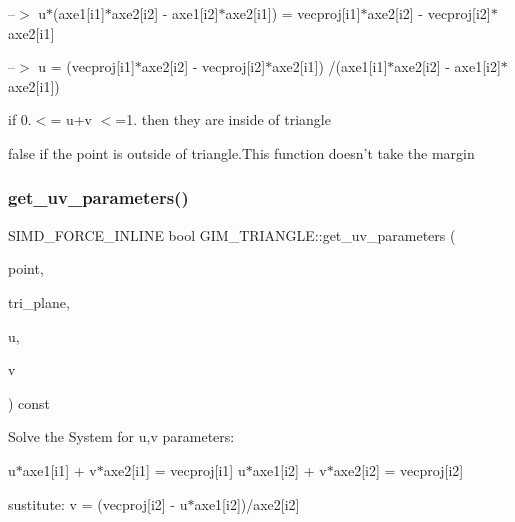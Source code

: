 --$>$ u$\ast$(axe1\mbox{[}i1\mbox{]}$\ast$axe2\mbox{[}i2\mbox{]} -\/ axe1\mbox{[}i2\mbox{]}$\ast$axe2\mbox{[}i1\mbox{]}) = vecproj\mbox{[}i1\mbox{]}$\ast$axe2\mbox{[}i2\mbox{]} -\/ vecproj\mbox{[}i2\mbox{]}$\ast$axe2\mbox{[}i1\mbox{]}

--$>$ u = (vecproj\mbox{[}i1\mbox{]}$\ast$axe2\mbox{[}i2\mbox{]} -\/ vecproj\mbox{[}i2\mbox{]}$\ast$axe2\mbox{[}i1\mbox{]}) /(axe1\mbox{[}i1\mbox{]}$\ast$axe2\mbox{[}i2\mbox{]} -\/ axe1\mbox{[}i2\mbox{]}$\ast$axe2\mbox{[}i1\mbox{]})

if 0.$<$= u+v $<$=1. then they are inside of triangle \begin{DoxyVerb}\return false if the point is outside of triangle.This function  doesn't take the margin\end{DoxyVerb}
 \mbox{\label{classGIM__TRIANGLE_aa35a00f5c7b9eeb8f0656be929294504}} 
\subsubsection{\texorpdfstring{get\+\_\+uv\+\_\+parameters()}{get\_uv\_parameters()}\hspace{0.1cm}{\footnotesize\ttfamily [2/2]}}
{\footnotesize\ttfamily S\+I\+M\+D\+\_\+\+F\+O\+R\+C\+E\+\_\+\+I\+N\+L\+I\+NE bool G\+I\+M\+\_\+\+T\+R\+I\+A\+N\+G\+L\+E\+::get\+\_\+uv\+\_\+parameters (\begin{DoxyParamCaption}\item[{const bt\+Vector3 \&}]{point,  }\item[{const bt\+Vector3 \&}]{tri\+\_\+plane,  }\item[{G\+R\+E\+AL \&}]{u,  }\item[{G\+R\+E\+AL \&}]{v }\end{DoxyParamCaption}) const\hspace{0.3cm}{\ttfamily [inline]}}

Solve the System for u,v parameters\+:

u$\ast$axe1\mbox{[}i1\mbox{]} + v$\ast$axe2\mbox{[}i1\mbox{]} = vecproj\mbox{[}i1\mbox{]} u$\ast$axe1\mbox{[}i2\mbox{]} + v$\ast$axe2\mbox{[}i2\mbox{]} = vecproj\mbox{[}i2\mbox{]}

sustitute\+: v = (vecproj\mbox{[}i2\mbox{]} -\/ u$\ast$axe1\mbox{[}i2\mbox{]})/axe2\mbox{[}i2\mbox{]}

